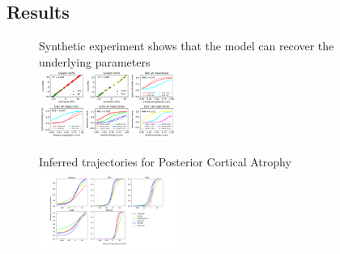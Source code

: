 \documentclass[portrait,a0,final,20pt]{a0poster}
\newcommand{\fnt}[1]{\LARGE{#1}}
\begin{document}
{\begin{multicols}{2}
\section*{Results}


\begin{figure}[H]
\fnt{Synthetic experiment shows that the model can recover the underlying parameters}\\
\includegraphics[width=0.4\textwidth]{../figures/compTrueParams105_synth1_JMD.pdf}
  \label{fig:dktSynthTrajCompTrue}
\end{figure}

\begin{figure}[H]
\centering
\fnt{Inferred trajectories for Posterior Cortical Atrophy}\\
 \includegraphics[width=0.4\textwidth, trim=0 20 0 0, clip]{../figures/trajDisSpaceOverlap_PCA_tad-drcTinyPen5_JMD.png}
\end{figure}



\end{multicols}}
\end{document}
